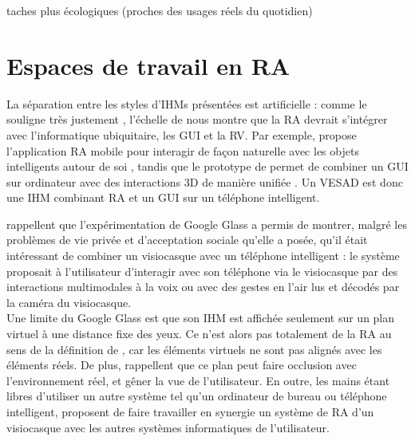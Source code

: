 taches plus écologiques (proches des usages réels du quotidien)


\section{Espaces de travail en RA}
La séparation entre les styles d'IHMs présentées \cite{Rekimoto1995}  est artificielle : comme le souligne très justement \cite{Billinghurst2015}, l'échelle de \cite{Milgram1994} nous montre que la RA devrait s'intégrer avec l'informatique ubiquitaire, les GUI et la RV. Par exemple, \cite{Heun2016} propose l'application RA mobile  pour interagir de façon naturelle avec les objets intelligents autour de soi , tandis que le prototype  de \cite{Lee2013} permet de combiner un GUI sur ordinateur avec des interactions 3D de manière unifiée . Un VESAD est donc une IHM combinant RA et un GUI sur un téléphone intelligent.


\cite{KoelleKranzMoeller2015} rappellent que l'expérimentation de Google Glass a permis de montrer, malgré les problèmes de vie privée et d'acceptation sociale qu'elle a posée, qu'il était intéressant de combiner un visiocasque avec un téléphone intelligent : le système proposait à l'utilisateur d'interagir avec son téléphone via le visiocasque par des interactions multimodales à la voix ou avec des gestes en l'air lus et décodés par la caméra du visiocasque.\\
Une limite du Google Glass est que son IHM est affichée seulement sur un plan virtuel à une distance fixe des yeux. Ce n'est alors pas totalement de la RA au sens de la définition de \cite{AzumaBaillotBehringerEtAl2001}, car les éléments virtuels ne sont pas alignés avec les éléments réels. De plus, \cite{SerranoEnsYangEtAl2015} rappellent que ce plan peut faire occlusion avec l'environnement réel, et gêner la vue de l'utilisateur. En outre, les mains étant libres d'utiliser un autre système tel qu'un ordinateur de bureau ou téléphone intelligent, \cite{SerranoEnsYangEtAl2015b} proposent de faire travailler en synergie un système de RA d'un visiocasque avec les autres systèmes informatiques de l'utilisateur.


